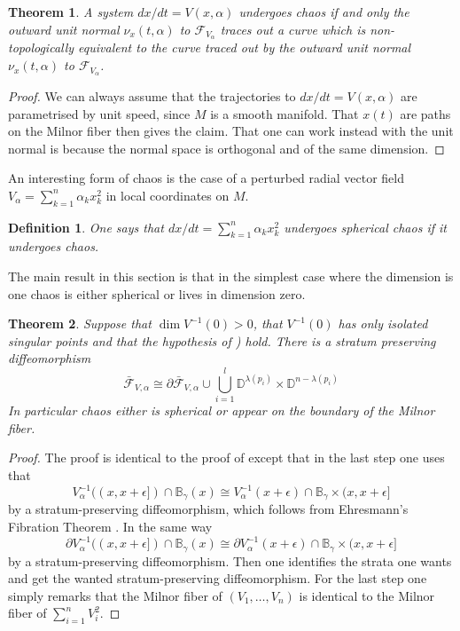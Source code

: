 \documentclass[10pt,a4paper]{amsart}
\newtheorem{theorem}{Theorem}
\newtheorem{definition}{Definition}
\begin{document}
\begin{theorem}
    A system $dx/dt=V(x, \alpha)$ undergoes chaos if and only the outward unit normal $\nu_x(t, \alpha)$ to $\mathcal{F}_{V_{\alpha}}$ traces out a curve which is non-topologically equivalent to the curve traced out by the outward unit normal $\nu_x(t, \alpha)$ to $\mathcal{F}_{V_{\alpha}}$.
\end{theorem}
\begin{proof}
    We can always assume that the trajectories to $dx/dt=V(x, \alpha)$ are parametrised by unit speed, since $M$ is a smooth manifold. That $x(t)$ are paths on the Milnor fiber then gives the claim. That one can work instead with the unit normal is because the normal space is orthogonal and of the same dimension.
\end{proof}

An interesting form of chaos is the case of a perturbed radial vector field $V_{\alpha}=\sum_{k=1}^n \alpha_k x_k^2$ in local coordinates on $M$. 

\begin{definition} One says that $dx/dt=\sum_{k=1}^n \alpha_k x_k^2$ undergoes spherical chaos if it undergoes chaos. 
\end{definition}

The main result in this section is that in the simplest case where the dimension is one chaos is either spherical or lives in dimension zero.

\begin{theorem}\label{Main theorem}
    Suppose that $\dim V^{-1}(0)>0$, that $V^{-1}(0)$ has only isolated singular points and that the hypothesis of \cite[Theorem 5]{LarsV})
    hold. There is a stratum preserving diffeomorphism 
    $$\bar{\mathcal{F}}_{V, \alpha}\cong \partial \bar{\mathcal{F}}_{V,\alpha}\cup \bigcup_{i=1}^l \mathbb{D}^{\lambda(p_i)}\times \mathbb{D}^{n-\lambda(p_i)}$$
    In particular chaos either is spherical or appear on the boundary of the Milnor fiber. 
\end{theorem}
\begin{proof}
    The proof is identical to the proof of \cite[Theorem 5]{LarsV} except that in the last step one uses that 
    $$V_{\alpha}^{-1}((x, x+\epsilon])\cap \mathbb{B}_{\gamma}(x)\cong V_{\alpha}^{-1}(x+\epsilon)\cap \mathbb{B}_{\gamma}\times (x, x+\epsilon]$$
    by a stratum-preserving diffeomorphism, which follows from Ehresmann's Fibration Theorem \cite{Kosinski}. In the same way 
    $$\partial V_{\alpha}^{-1}((x, x+\epsilon])\cap \mathbb{B}_{\gamma}(x)\cong \partial V_{\alpha}^{-1}(x+\epsilon)\cap \mathbb{B}_{\gamma}\times (x, x+\epsilon]$$
    by a stratum-preserving diffeomorphism. Then one identifies the strata one wants and get the wanted stratum-preserving diffeomorphism. For the last step one simply remarks that the Milnor fiber of 
    $(V_1,\dots, V_n)$ is identical to the Milnor fiber of $\sum_{i=1}^n V_i^2$.
\end{proof}
\end{document}
